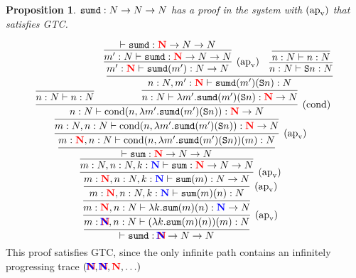\documentclass{article}
\newcommand{\bfColor}[2]{{\bf \color{#1}{#2}}}
\newcommand{\Rapv}{\hbox{$(\text{ap}_{\text{v}})$}}
\newcommand{\Rcond}{\hbox{$(\text{cond})$}}
\newcommand{\Sum}{{\tt sum}}
\newcommand{\Sumd}{{\tt sumd}}
\newcommand{\Cond}[2]{\text{cond}(#1,#2)}
\newcommand{\Suc}[1]{{\tt S}#1}
\newcommand{\N}{N}
\newcommand{\rN}{\bfColor{red}{N}}
\newcommand{\bN}{\bfColor{blue}{N}}
\newcommand{\rbN}{\bfColor{red}{N}\hspace{-1em}\bfColor{blue}{N}}
\newtheorem{proposition}[theorem]{Proposition}
\begin{document}
\begin{proposition}
  $\Sumd:\N\to\N\to\N$ has a proof in the system with $\Rapv$ that satisfies GTC. 
\end{proposition}
\[
\infer{
  \vdash \Sumd:\rbN\to\N\to\N
}{
  \infer[\Rapv]{
    m:\rbN, n:\N \vdash (\lambda k.\Sum(m)(n))(m):\N
  }{
    \infer{
      m:\rN, n:\N \vdash \lambda k.\Sum(m)(n):\bN\to\N
    }{
      \infer[\Rapv]{
        m:\rN, n:\N, k:\bN \vdash \Sum(m)(n):\N
      }{
        \infer[\Rapv]{
          m:\rN, n:\N, k:\bN \vdash \Sum(m):\N\to\N
        }{
          \infer{
            m:\N, n:\N, k:\bN \vdash \Sum:\rN\to\N\to\N
          }{
            \infer{
              \vdash \Sum:\rN\to\N\to\N
            }{
              \infer[\Rapv]{
                m:\rN,n:\N\vdash\Cond{n}{\lambda m'.\Sumd(m')(\Suc{n})}(m):\N
              }{
                \infer{
                  m:\N,n:\N\vdash\Cond{n}{\lambda m'.\Sumd(m')(\Suc{n})}:\rN\to\N
                }{
                  \infer[\Rcond]{
                    n:\N\vdash\Cond{n}{\lambda m'.\Sumd(m')(\Suc{n})}:\rN\to\N
                  }{
                    \infer{
                      n:\N \vdash n:\N
                    }{}
                    &
                    \infer{
                      n:\N\vdash\lambda m'.\Sumd(m')(\Suc{n}):\rN\to\N
                    }{
                      \infer{
                        n:\N,m':\rN\vdash\Sumd(m')(\Suc{n}):\N
                      }{
                        \infer[\Rapv]{
                          m':\rN\vdash\Sumd(m'):\N\to\N
                        }{
                          \infer{
                            m':\N\vdash\Sumd:\rN\to\N\to\N
                          }{
                            \vdash\Sumd:\rN\to\N\to\N
                          }
                        }
                        &
                        \infer{
                          n:\N\vdash\Suc{n}:\N
                        }{
                          \infer{
                            n:\N\vdash n:\N
                          }{}
                        }
                      }
                    }
                  }
                }
              }
            }
          }
        }
      }
    }
  }
}
\]
This proof satisfies GTC,
since the only infinite path contains an infinitely progressing trace $(\rbN,\rbN,\rN,\ldots)$
\end{document}
